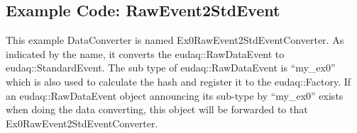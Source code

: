 \subsection{Example Code: RawEvent2StdEvent}\label{sec:Ex0RawEvent2StdEventConverter_cc}
This example DataConverter is named Ex0RawEvent2StdEventConverter. As indicated by the name, it converts the eudaq::RawDataEvent to eudaq::StandardEvent. The sub type of eudaq::RawDataEvent is ``my\_ex0'' which is also used to calculate the hash and register it to the eudaq::Factory. If an eudaq::RawDataEvent object announcing its sub-type by ``my\_ex0'' exists when doing the data converting, this object will be forwarded to that Ex0RawEvent2StdEventConverter.


